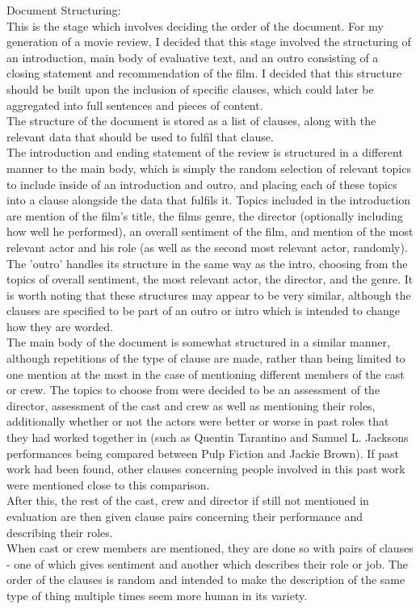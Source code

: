 Document Structuring:\\
This is the stage which involves deciding the order of the document. For my generation of a movie review, I decided that this stage involved the structuring of an introduction, main body of evaluative text, and an outro consisting of a closing statement and recommendation of the film.
I decided that this structure should be built upon the inclusion of specific clauses, which could later be aggregated into full sentences and pieces of content.\\

The structure of the document is stored as a list of clauses, along with the relevant data that should be used to fulfil that clause.\\
The introduction and ending statement of the review is structured in a different manner to the main body, which is simply the random selection of relevant topics to include inside of an introduction and outro, and placing each of these topics into a clause alongside the data that fulfils it.
Topics included in the introduction are mention of the film's title, the films genre, the director (optionally including how well he performed), an overall sentiment of the film, and mention of the most relevant actor and his role (as well as the second most relevant actor, randomly).
The 'outro' handles its structure in the same way as the intro, choosing from the topics of overall sentiment, the most relevant actor, the director, and the genre. It is worth noting that these structures may appear to be very similar, although the clauses are specified to be part of an outro or intro which is intended to change how they are worded.\\

The main body of the document is somewhat structured in a similar manner, although repetitions of the type of clause are made, rather than being limited to one mention at the most in the case of mentioning different members of the cast or crew. The topics to choose from were decided to be an assessment of the director, assessment of the cast and crew as well as mentioning their roles, additionally whether or not the actors were better or worse in past roles that they had worked together in (such as Quentin Tarantino and Samuel L. Jacksons performances being compared between Pulp Fiction and Jackie Brown). If past work had been found, other clauses concerning people involved in this past work were mentioned close to this comparison.\\
After this, the rest of the cast, crew and director if still not mentioned in evaluation are then given clause pairs concerning their performance and describing their roles.\\
When cast or crew members are mentioned, they are done so with pairs of clauses - one of which gives sentiment and another which describes their role or job. The order of the clauses is random and intended to make the description of the same type of thing multiple times seem more human in its variety.\\



